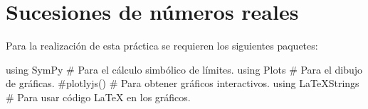 \documentclass[
  a4paper,
]{scrreport}
\newenvironment{Shaded}{\begin{snugshade}}{\end{snugshade}}
\newcommand{\BuiltInTok}[1]{\textcolor[rgb]{0.00,0.23,0.31}{#1}}
\newcommand{\CommentTok}[1]{\textcolor[rgb]{0.37,0.37,0.37}{#1}}
\newcommand{\ImportTok}[1]{\textcolor[rgb]{0.00,0.46,0.62}{#1}}
\theoremstyle{definition}
\theoremstyle{remark}
\begin{document}

\hypertarget{sucesiones-de-nuxfameros-reales}{%
\chapter{Sucesiones de números
reales}\label{sucesiones-de-nuxfameros-reales}}

Para la realización de esta práctica se requieren los siguientes
paquetes:

\begin{Shaded}
\begin{Highlighting}[]
\ImportTok{using} \BuiltInTok{SymPy  }\CommentTok{\# Para el cálculo simbólico de límites.}
\ImportTok{using} \BuiltInTok{Plots  }\CommentTok{\# Para el dibujo de gráficas.}
\CommentTok{\#plotlyjs() \# Para obtener gráficos interactivos.}
\ImportTok{using} \BuiltInTok{LaTeXStrings  }\CommentTok{\# Para usar código LaTeX en los gráficos.}
\end{Highlighting}
\end{Shaded}
\end{document}
